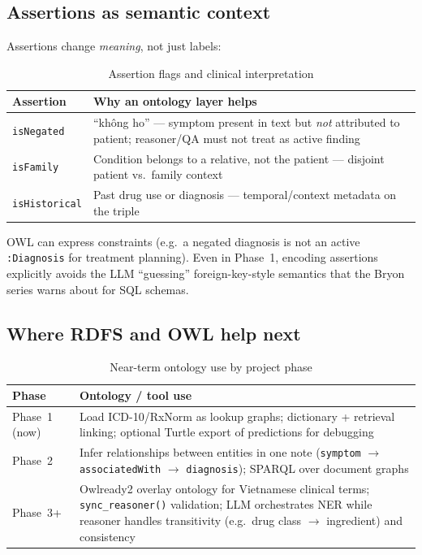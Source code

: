 \newpage
\subsection{Assertions as semantic context}

Assertions change \emph{meaning}, not just labels:

\begin{table}[htbp]
  \centering
  \small
  \caption{Assertion flags and clinical interpretation}
  \label{tab:assertions}
  \renewcommand{\arraystretch}{1.15}
  \begin{tabularx}{\textwidth}{@{}l X@{}}
    \toprule
    \textbf{Assertion} & \textbf{Why an ontology layer helps} \\
    \midrule
    \texttt{isNegated} &
    ``không ho'' --- symptom present in text but \emph{not} attributed to patient;
    reasoner/QA must not treat as active finding \\
    \texttt{isFamily} &
    Condition belongs to a relative, not the patient --- disjoint patient vs.\ family
    context \\
    \texttt{isHistorical} &
    Past drug use or diagnosis --- temporal/context metadata on the triple \\
    \bottomrule
  \end{tabularx}
\end{table}

OWL can express constraints (e.g.\ a negated diagnosis is not an active
\texttt{:Diagnosis} for treatment planning). Even in Phase~1, encoding assertions
explicitly avoids the LLM ``guessing'' foreign-key-style semantics that the Bryon
series warns about for SQL schemas.

\subsection{Where RDFS and OWL help next}

\begin{table}[htbp]
  \centering
  \small
  \caption{Near-term ontology use by project phase}
  \label{tab:phase-roadmap}
  \renewcommand{\arraystretch}{1.15}
  \begin{tabularx}{\textwidth}{@{}l X@{}}
    \toprule
    \textbf{Phase} & \textbf{Ontology / tool use} \\
    \midrule
    Phase~1 (now) &
    Load ICD-10/RxNorm as lookup graphs; dictionary + retrieval linking;
    optional Turtle export of predictions for debugging \\
    Phase~2 &
    Infer relationships between entities in one note
    (\texttt{symptom} $\rightarrow$ \texttt{associatedWith} $\rightarrow$
    \texttt{diagnosis}); SPARQL over document graphs \\
    Phase~3+ &
    Owlready2 overlay ontology for Vietnamese clinical terms;
    \texttt{sync\_reasoner()} validation; LLM orchestrates NER while reasoner
    handles transitivity (e.g.\ drug class $\rightarrow$ ingredient) and consistency \\
    \bottomrule
  \end{tabularx}
\end{table}

